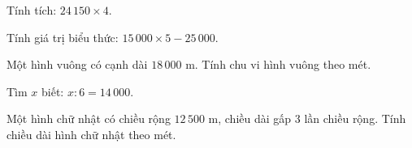\begin{ex} %
Tính tích: $24\,150 \times 4$.
\end{ex}

\begin{ex} %
Tính giá trị biểu thức: $15\,000 \times 5 - 25\,000$.
\end{ex}

\begin{ex} %
Một hình vuông có cạnh dài $18\,000\text{ m}$. Tính chu vi hình vuông theo mét.
\end{ex}

\begin{ex} %
Tìm $x$ biết: $x : 6 = 14\,000$.
\end{ex}

\begin{ex} %
Một hình chữ nhật có chiều rộng $12\,500\text{ m}$, chiều dài gấp 3 lần chiều rộng. Tính chiều dài hình chữ nhật theo mét.
\end{ex}
